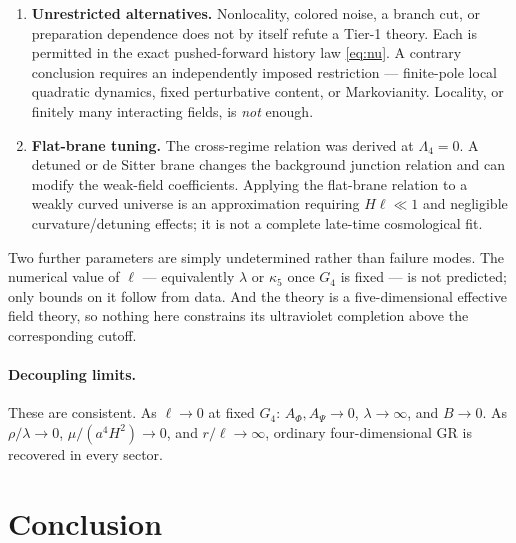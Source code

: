 \documentclass[11pt,a4paper]{article}
\theoremstyle{plain}
\theoremstyle{definition}
\newcommand{\kfive}{\kappa_5}
\newcommand{\Lfour}{\Lambda_4}
\begin{document}
\begin{enumerate}[leftmargin=*]
\item \textbf{Unrestricted alternatives.} Nonlocality, colored noise, a
branch cut, or preparation dependence does not by itself refute a Tier-1
theory. Each is permitted in the exact pushed-forward history law
\eqref{eq:nu}. A contrary conclusion requires an independently imposed
restriction --- finite-pole local quadratic dynamics, fixed perturbative
content, or Markovianity. Locality, or finitely many interacting fields,
is \emph{not} enough.

\item \textbf{Flat-brane tuning.} The cross-regime relation was derived
at $\Lfour=0$. A detuned or de Sitter brane changes the background
junction relation and can modify the weak-field coefficients. Applying
the flat-brane relation to a weakly curved universe is an approximation
requiring $H\ell\ll1$ and negligible curvature/detuning effects; it is not
a complete late-time cosmological fit.
\end{enumerate}

Two further parameters are simply undetermined rather than failure modes.
The numerical value of $\ell$ --- equivalently $\lambda$ or $\kfive$ once
$G_4$ is fixed --- is not predicted; only bounds on it follow from data.
And the theory is a five-dimensional effective field theory, so nothing
here constrains its ultraviolet completion above the corresponding cutoff.

\paragraph{Decoupling limits.}
These are consistent. As $\ell\to0$ at fixed $G_4$: $A_\Phi,A_\Psi\to0$,
$\lambda\to\infty$, and $B\to0$. As $\rho/\lambda\to0$,
$\mu/(a^4H^2)\to0$, and $r/\ell\to\infty$, ordinary four-dimensional GR
is recovered in every sector.

\section{Conclusion}
\label{sec:conclusion}
\end{document}
